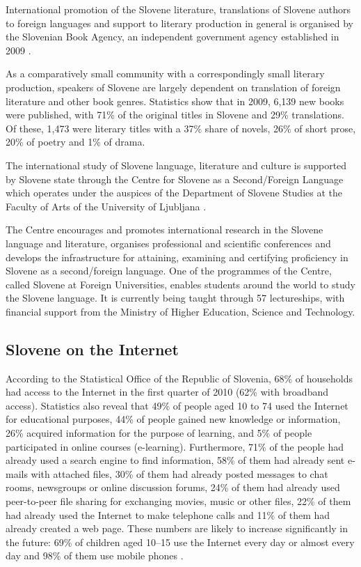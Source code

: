 \begin{multicols}{2}
International promotion of the Slovene literature, translations of Slovene authors to foreign languages and support to literary production in general is organised by the Slovenian Book Agency, an independent government agency established in 2009 \cite{JAKRS1}.  

As a comparatively small community with a correspondingly small literary production, speakers of Slovene are largely dependent on translation of foreign literature and other book genres. Statistics show that in 2009, 6,139 new books were published, with 71\% of the original titles in Slovene and 29\% translations. Of these, 1,473 were literary titles with a 37\% share of novels, 26\% of short prose, 20\% of poetry and 1\% of drama. 

The international study of Slovene language, literature and culture is supported by Slovene state through the Centre for Slovene as a Second/Foreign Language which operates under the auspices of the Department of Slovene Studies at the Faculty of Arts of the University of Ljub\-ljana \cite{CSDTJ1}.  

The Centre encourages and promotes international research in the Slovene language and literature, organises professional and scientific conferences and develops the infrastructure for attaining, examining and certifying proficiency in Slovene as a second/foreign language. One of the programmes of the Centre, called Slovene at Foreign Universities, enables students around the world to study the Slovene language. It is currently being taught through 57 lectureships, with financial support from the Ministry of Higher Education, Science and Technology.


\subsection{Slovene on the Internet}

According to the Statistical Office of the Republic of Slovenia, 68\% of households had access to the Internet in the first quarter of 2010 (62\% with broadband access). Statistics also reveal that 49\% of people aged 10 to 74 used the Internet for educational purposes, 44\% of people gained new knowledge or information, 26\% acquired information for the purpose of learning, and 5\% of people participated in online courses (e-learning). Furthermore, 71\% of the people had already used a search engine to find information, 58\% of them had already sent e-mails with attached files, 30\% of them had already posted messages to chat rooms, newsgroups or online discussion forums, 24\% of them had already used peer-to-peer file sharing for exchanging movies, music or other files, 22\% of them had already used the Internet to make telephone calls and 11\% of them had already created a web page. These numbers are likely to increase significantly in the future: 69\% of children aged 10--15 use the Internet every day or almost every day and 98\% of them use mobile phones  \cite{SURS3}. 


\end{multicols}
